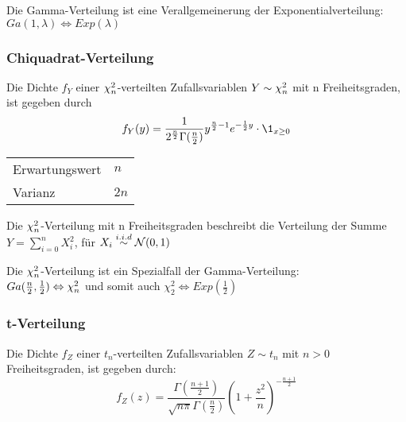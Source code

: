 \begin{note}
	Die Gamma-Verteilung ist eine Verallgemeinerung der Exponentialverteilung:
	\(Ga(1,\lambda) \Leftrightarrow Exp(\lambda)\)
\end{note}




\subsubsection{Chiquadrat-Verteilung}
Die Dichte \(f_Y\) einer \(\chi_n^2\)-verteilten Zufallsvariablen \(Y \sim \chi_n^2\)
mit n Freiheitsgraden, ist gegeben durch
\[
	f_Y(y) =
	\frac{1}{ 2^{ \frac{n}{2} } \Gamma( \frac{n}{2} )}
	y^{ \frac{n}{2} - 1}
	e^{ -\frac{1}{2} y}
	\cdot \1_{x \geq 0}
\]

\begin{highlight}
	\begin{tabular}{l@{ : }l}
		Erwartungswert & \(n\)  \\
		Varianz        & \(2n\)
	\end{tabular}
\end{highlight}

Die \(\chi_n^2\)-Verteilung mit n Freiheitsgraden beschreibt die Verteilung der Summe
\(Y = \sum_{i=0}^n X_i^2\), für \(X_i \stackrel{i.i.d}{\sim} \mathcal{N}(0,1)\)

\begin{note}
	Die \(\chi_n^2\)-Verteilung ist ein Spezialfall der Gamma-Verteilung:\\
	\(Ga(\frac{n}{2},\frac{1}{2}) \Leftrightarrow \chi_n^2\) und somit auch
	\(\chi_2^2 \Leftrightarrow Exp(\frac{1}{2})\)
\end{note}



\subsubsection{t-Verteilung}
Die Dichte \(f_Z\) einer \(t_n\)-verteilten Zufallsvariablen \(Z \sim t_n\)
mit \(n > 0\) Freiheitsgraden, ist gegeben durch:
\[
	f_Z(z) =
	\frac{ \Gamma ( \frac{n+1}{2} ) }
	{ \sqrt{n\pi} \Gamma ( \frac{n}{2} ) }
	\left( 1 + \frac{ z^2 }{ n } \right) ^ {- \frac{ n+1 }{ 2 } }
\]

